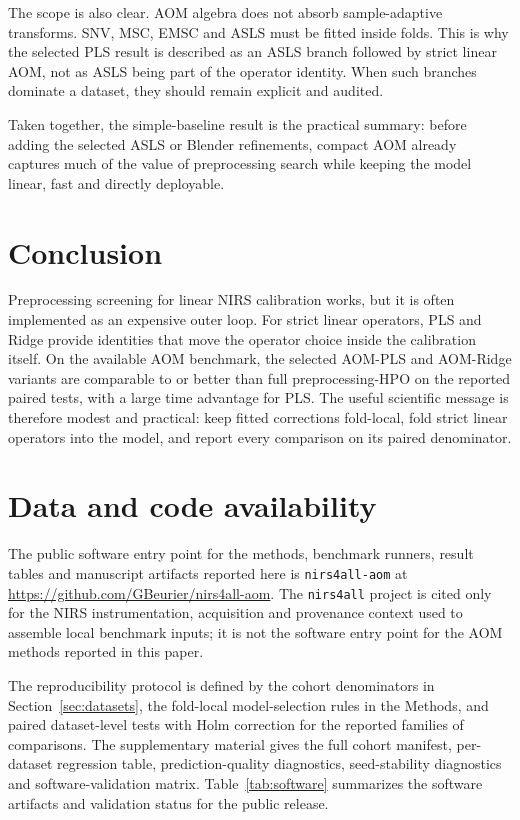 \documentclass[11pt,a4paper]{article}
\begin{document}
The scope is also clear.  AOM algebra does not absorb sample-adaptive
transforms.  SNV, MSC, EMSC and ASLS must be fitted inside folds.  This is why
the selected PLS result is described as an ASLS branch followed by strict
linear AOM, not as ASLS being part of the operator identity.  When such
branches dominate a dataset, they should remain explicit and audited.

Taken together, the simple-baseline result is the practical summary: before
adding the selected ASLS or Blender refinements, compact AOM already captures
much of the value of preprocessing search while keeping the model linear,
fast and directly deployable.

\section{Conclusion}

Preprocessing screening for linear NIRS calibration works, but it is often
implemented as an expensive outer loop.  For strict linear operators, PLS and
Ridge provide identities that move the operator choice inside the calibration
itself.  On the available AOM benchmark, the selected AOM-PLS and AOM-Ridge
variants are comparable to or better than full preprocessing-HPO on the
reported paired tests, with a large time advantage for PLS.  The useful scientific message
is therefore modest and practical: keep fitted corrections fold-local, fold
strict linear operators into the model, and report every comparison on its
paired denominator.

\section*{Data and code availability}

The public software entry point for the methods, benchmark runners, result
tables and manuscript artifacts reported here is \texttt{nirs4all-aom}
\citep{beurier2026aomnirs} at
\url{https://github.com/GBeurier/nirs4all-aom}.  The \texttt{nirs4all} project
\citep{beurier2026nirs4all} is cited only for the NIRS instrumentation,
acquisition and provenance context used to assemble local benchmark inputs; it
is not the software entry point for the AOM methods reported in this paper.

The reproducibility protocol is defined by the cohort denominators in
Section~\ref{sec:datasets}, the fold-local model-selection rules in the
Methods, and paired dataset-level tests with Holm correction for the reported
families of comparisons.  The supplementary material gives the full cohort
manifest, per-dataset regression table, prediction-quality diagnostics,
seed-stability diagnostics and software-validation matrix.  Table~\ref{tab:software} summarizes
the software artifacts and validation status for the public release.
\end{document}

